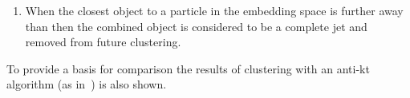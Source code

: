 \begin{enumerate}
    \item When the closest object to a particle in the embedding space is further away than \stoppingdeltar{}
    then the combined object is considered to be a complete jet and removed from future clustering.
\end{enumerate}
To provide a basis for comparison the results of clustering with an anti-kt algorithm (as in~\cite{Cacciari2008akt}) is also shown.

